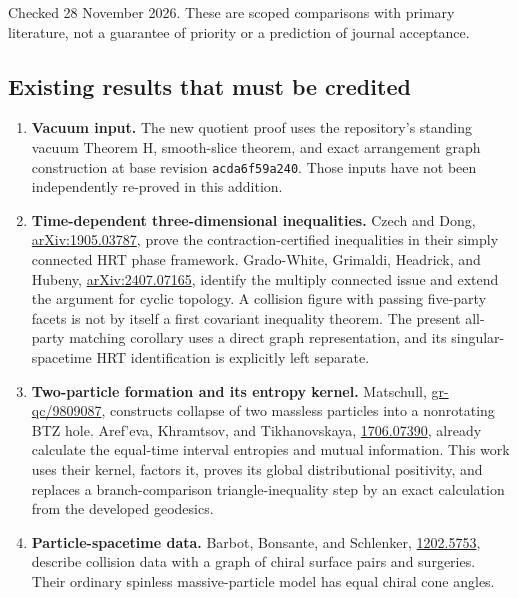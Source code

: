 \documentclass[11pt]{article}
\begin{document}
Checked 28 November 2026. These are scoped comparisons with primary
literature, not a guarantee of priority or a prediction of journal
acceptance.

\subsection{Existing results that must be
credited}\label{existing-results-that-must-be-credited}

\begin{enumerate}
\def\labelenumi{\arabic{enumi}.}
\item
  \textbf{Vacuum input.} The new quotient proof uses the repository's
  standing vacuum Theorem H, smooth-slice theorem, and exact arrangement
  graph construction at base revision \texttt{acda6f59a240}. Those
  inputs have not been independently re-proved in this addition.
\item
  \textbf{Time-dependent three-dimensional inequalities.} Czech and
  Dong, \href{https://arxiv.org/abs/1905.03787}{arXiv:1905.03787}, prove
  the contraction-certified inequalities in their simply connected HRT
  phase framework. Grado-White, Grimaldi, Headrick, and Hubeny,
  \href{https://arxiv.org/abs/2407.07165}{arXiv:2407.07165}, identify
  the multiply connected issue and extend the argument for cyclic
  topology. A collision figure with passing five-party facets is not by
  itself a first covariant inequality theorem. The present all-party
  matching corollary uses a direct graph representation, and its
  singular-spacetime HRT identification is explicitly left separate.
\item
  \textbf{Two-particle formation and its entropy kernel.} Matschull,
  \href{https://arxiv.org/abs/gr-qc/9809087}{gr-qc/9809087}, constructs
  collapse of two massless particles into a nonrotating BTZ hole.
  Aref'eva, Khramtsov, and Tikhanovskaya,
  \href{https://arxiv.org/abs/1706.07390}{1706.07390}, already calculate
  the equal-time interval entropies and mutual information. This work
  uses their kernel, factors it, proves its global distributional
  positivity, and replaces a branch-comparison triangle-inequality step
  by an exact calculation from the developed geodesics.
\item
  \textbf{Particle-spacetime data.} Barbot, Bonsante, and Schlenker,
  \href{https://arxiv.org/abs/1202.5753}{1202.5753}, describe collision
  data with a graph of chiral surface pairs and surgeries. Their
  ordinary spinless massive-particle model has equal chiral cone angles.

\end{enumerate}
\end{document}

